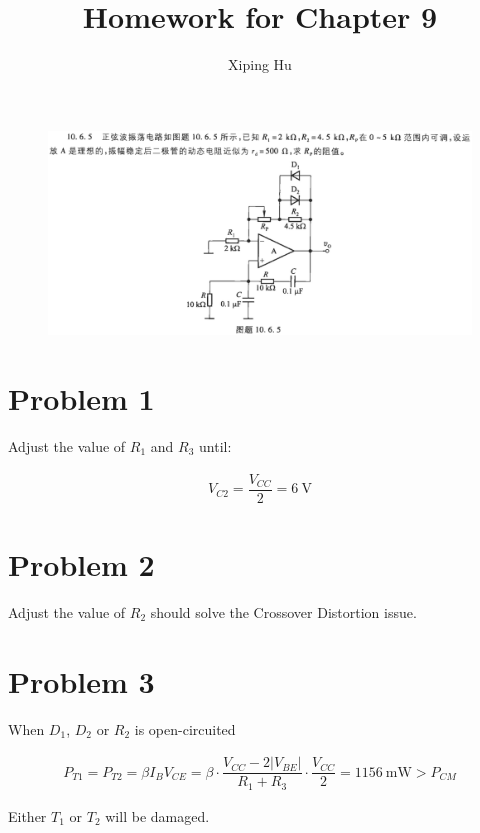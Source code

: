 \documentclass{article}
\author{Xiping Hu}
\affil{https://hxp.plus/}
\title{Homework for Chapter 9}
\newcommand{\si}[1]{\  \mathrm{#1}}
\begin{document}
\maketitle

\begin{figure}[H]
  \centering
  \includegraphics[width=\linewidth]{figures/Problem1065}
\end{figure}

\section{Problem 1}

Adjust the value of $R_1$ and $R_3$ until: 

\begin{equation*}
  \begin{aligned}
    V_{C2} = \dfrac{V_{CC}}{2} = 6 \si{V} 
  \end{aligned}
\end{equation*}

\section{Problem 2}

Adjust the value of $R_2$ should solve the Crossover Distortion issue.

\section{Problem 3}

When $D_1$, $D_2$ or $R_2$ is open-circuited

\begin{equation*}
  \begin{aligned}
    P_{T1} = P_{T2} = \beta I_B V_{CE} = \beta \cdot \dfrac{V_{CC} - 2 |V_{BE}|}{R_1 + R_3} \cdot \dfrac{V_{CC}}{2} = 1156 \si{mW} > P_{CM}  
  \end{aligned}
\end{equation*}

Either $T_1$ or $T_2$ will be damaged.
\end{document}
